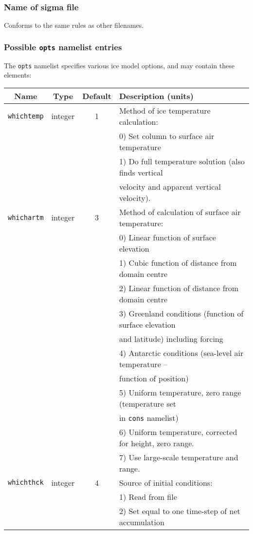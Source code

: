 \subsubsection{Name of sigma file}
%
Conforms to the same rules as other filenames.
%
\subsubsection{Possible \texttt{opts} namelist entries}
%
The \texttt{opts} namelist specifies various ice model options, and may
contain these elements:
%
\begin{center}
\begin{tabular}{|c|c|c|l|}
\hline
Name & Type & Default & Description (units)\\
\hline
\hline
\texttt{whichtemp} & integer & 1 & Method of ice temperature calculation: \\
 & & & 0) Set column to surface air temperature \\
 & & & 1) Do full temperature solution (also finds vertical \\
 & & & velocity and apparent vertical velocity). \\
\hline
\texttt{whichartm} & integer & 3 & Method of calculation of surface air
temperature: \\
 & & & 0) Linear function of surface elevation \\
 & & & 1) Cubic function of distance from domain centre \\
 & & & 2) Linear function of distance from domain centre \\
 & & & 3) Greenland conditions (function of surface elevation \\
 & & & and latitude) including forcing \\
 & & & 4) Antarctic conditions (sea-level air temperature -- \\
 & & & function of position) \\
 & & & 5) Uniform temperature, zero range (temperature set \\
 & & & in \texttt{cons} namelist) \\
 & & & 6) Uniform temperature, corrected for height, zero range. \\
 & & & 7) Use large-scale temperature and range. \\
\hline
\texttt{whichthck} & integer & 4 & Source of initial conditions: \\
 & & & 1) Read from file \\
 & & & 2) Set equal to one time-step of net accumulation \\

\end{tabular}
\end{center}
